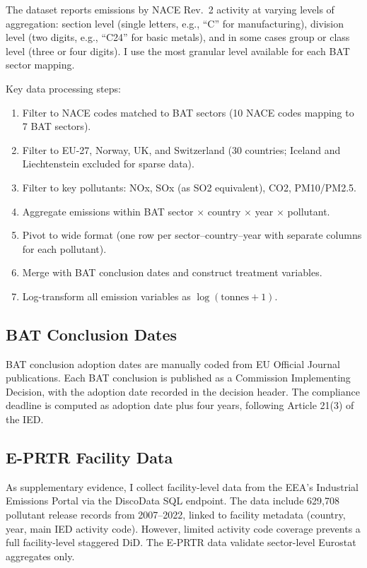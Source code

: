 \documentclass[12pt]{article}
\begin{document}
The dataset reports emissions by NACE Rev.~2 activity at varying levels of aggregation: section level (single letters, e.g., ``C'' for manufacturing), division level (two digits, e.g., ``C24'' for basic metals), and in some cases group or class level (three or four digits). I use the most granular level available for each BAT sector mapping.

Key data processing steps:
\begin{enumerate}
  \item Filter to NACE codes matched to BAT sectors (10 NACE codes mapping to 7 BAT sectors).
  \item Filter to EU-27, Norway, UK, and Switzerland (30 countries; Iceland and Liechtenstein excluded for sparse data).
  \item Filter to key pollutants: NOx, SOx (as SO2 equivalent), CO2, PM10/PM2.5.
  \item Aggregate emissions within BAT sector $\times$ country $\times$ year $\times$ pollutant.
  \item Pivot to wide format (one row per sector--country--year with separate columns for each pollutant).
  \item Merge with BAT conclusion dates and construct treatment variables.
  \item Log-transform all emission variables as $\log(\text{tonnes} + 1)$.
\end{enumerate}

\subsection{BAT Conclusion Dates}

BAT conclusion adoption dates are manually coded from EU Official Journal publications. Each BAT conclusion is published as a Commission Implementing Decision, with the adoption date recorded in the decision header. The compliance deadline is computed as adoption date plus four years, following Article 21(3) of the IED.

\subsection{E-PRTR Facility Data}

As supplementary evidence, I collect facility-level data from the EEA's Industrial Emissions Portal via the DiscoData SQL endpoint. The data include 629,708 pollutant release records from 2007--2022, linked to facility metadata (country, year, main IED activity code). However, limited activity code coverage prevents a full facility-level staggered DiD. The E-PRTR data validate sector-level Eurostat aggregates only.
\end{document}
